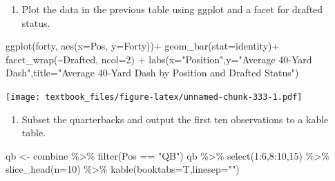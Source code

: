 \documentclass[
  11pt,
]{book}
\newenvironment{Shaded}{\begin{snugshade}}{\end{snugshade}}
\newcommand{\AttributeTok}[1]{\textcolor[rgb]{0.77,0.63,0.00}{#1}}
\newcommand{\DecValTok}[1]{\textcolor[rgb]{0.00,0.00,0.81}{#1}}
\newcommand{\FunctionTok}[1]{\textcolor[rgb]{0.00,0.00,0.00}{#1}}
\newcommand{\NormalTok}[1]{#1}
\newcommand{\OtherTok}[1]{\textcolor[rgb]{0.56,0.35,0.01}{#1}}
\newcommand{\SpecialCharTok}[1]{\textcolor[rgb]{0.00,0.00,0.00}{#1}}
\newcommand{\StringTok}[1]{\textcolor[rgb]{0.31,0.60,0.02}{#1}}
\providecommand{\tightlist}{%
  \setlength{\itemsep}{0pt}\setlength{\parskip}{0pt}}
\theoremstyle{definition}
\theoremstyle{definition}
\theoremstyle{definition}
\theoremstyle{definition}
\theoremstyle{remark}
\begin{document}
\begin{enumerate}
\def\labelenumi{(\alph{enumi})}
\setcounter{enumi}{5}
\tightlist
\item
  Plot the data in the previous table using ggplot and a facet for drafted status.
\end{enumerate}

\begin{Shaded}
\begin{Highlighting}[]
\FunctionTok{ggplot}\NormalTok{(forty, }\FunctionTok{aes}\NormalTok{(}\AttributeTok{x=}\NormalTok{Pos, }\AttributeTok{y=}\NormalTok{Forty))}\SpecialCharTok{+}
  \FunctionTok{geom\_bar}\NormalTok{(}\AttributeTok{stat=}\StringTok{\textquotesingle{}identity\textquotesingle{}}\NormalTok{)}\SpecialCharTok{+}
  \FunctionTok{facet\_wrap}\NormalTok{(}\SpecialCharTok{\textasciitilde{}}\NormalTok{Drafted,  }\AttributeTok{ncol=}\DecValTok{2}\NormalTok{) }\SpecialCharTok{+}
  \FunctionTok{labs}\NormalTok{(}\AttributeTok{x=}\StringTok{"Position"}\NormalTok{,}\AttributeTok{y=}\StringTok{"Average 40{-}Yard Dash"}\NormalTok{,}\AttributeTok{title=}\StringTok{"Average 40{-}Yard Dash by Position and Drafted Status"}\NormalTok{)}
\end{Highlighting}
\end{Shaded}

\texttt{[image: textbook\_files/figure-latex/unnamed-chunk-333-1.pdf]}

\newpage

\begin{enumerate}
\def\labelenumi{(\alph{enumi})}
\setcounter{enumi}{6}
\tightlist
\item
  Subset the quarterbacks and output the first ten observations to a kable table.
\end{enumerate}

\begin{Shaded}
\begin{Highlighting}[]
\NormalTok{qb }\OtherTok{\textless{}{-}}\NormalTok{ combine }\SpecialCharTok{\%\textgreater{}\%} \FunctionTok{filter}\NormalTok{(Pos }\SpecialCharTok{==} \StringTok{"QB"}\NormalTok{)}
\NormalTok{qb }\SpecialCharTok{\%\textgreater{}\%} \FunctionTok{select}\NormalTok{(}\DecValTok{1}\SpecialCharTok{:}\DecValTok{6}\NormalTok{,}\DecValTok{8}\SpecialCharTok{:}\DecValTok{10}\NormalTok{,}\DecValTok{15}\NormalTok{) }\SpecialCharTok{\%\textgreater{}\%} \FunctionTok{slice\_head}\NormalTok{(}\AttributeTok{n=}\DecValTok{10}\NormalTok{) }\SpecialCharTok{\%\textgreater{}\%} \FunctionTok{kable}\NormalTok{(}\AttributeTok{booktabs=}\NormalTok{T,}\AttributeTok{linesep=}\StringTok{""}\NormalTok{)}
\end{Highlighting}
\end{Shaded}
\end{document}
